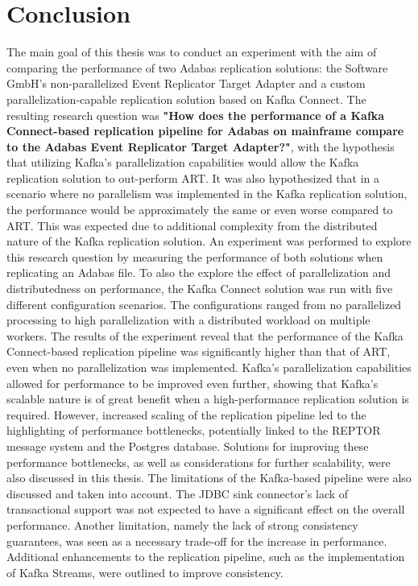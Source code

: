 \chapter{Conclusion}
\label{ch08:conclusion}
The main goal of this thesis was to conduct an experiment with the aim of comparing the performance of two Adabas replication solutions: the Software GmbH's non-parallelized Event Replicator Target Adapter and a custom parallelization-capable replication solution based on Kafka Connect. The resulting research question was \textbf{"How does the performance of a Kafka Connect-based replication pipeline for Adabas on mainframe compare to the Adabas Event Replicator Target Adapter?"}, with the hypothesis that utilizing Kafka's parallelization capabilities would allow the Kafka replication solution to out-perform \ac{ART}. It was also hypothesized that in a scenario where no parallelism was implemented in the Kafka replication solution, the performance would be approximately the same or even worse compared to \ac{ART}. This was expected due to additional complexity from the distributed nature of the Kafka replication solution. An experiment was performed to explore this research question by measuring the performance of both solutions when replicating an Adabas file. To also the explore the effect of parallelization and distributedness on performance, the Kafka Connect solution was run with five different configuration scenarios. The configurations ranged from no parallelized processing to high parallelization with a distributed workload on multiple workers.
The results of the experiment reveal that the performance of the Kafka Connect-based replication pipeline was significantly higher than that of \ac{ART}, even when no parallelization was implemented. Kafka's parallelization capabilities allowed for performance to be improved even further, showing that Kafka's scalable nature is of great benefit when a high-performance replication solution is required. However, increased scaling of the replication pipeline led to the highlighting of performance bottlenecks, potentially linked to the \ac{REPTOR} message system and the Postgres database. Solutions for improving these performance bottlenecks, as well as considerations for further scalability, were also discussed in this thesis. The limitations of the Kafka-based pipeline were also discussed and taken into account. The \ac{JDBC} sink connector's lack of transactional support was not expected to have a significant effect on the overall performance. Another limitation, namely the lack of strong consistency guarantees, was seen as a necessary trade-off for the increase in performance. Additional enhancements to the replication pipeline, such as the implementation of Kafka Streams, were outlined to improve consistency.

